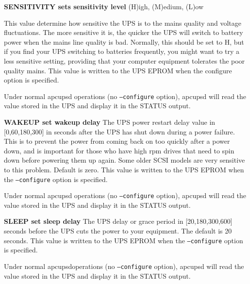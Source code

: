 \begin{description}

\item {\bf SENSITIVITY \lt{}sets sensitivity level\gt{}}
(H)igh, (M)edium, (L)ow  

This value determine how sensitive the UPS is to the mains quality and voltage
fluctuations. The more sensitive it is, the quicker the UPS will switch to
battery power when the mains line quality is bad. Normally, this should be set
to H, but if you find your UPS switching to batteries frequently, you might
want to try a less sensitive setting, providing that your computer equipment
tolerates the poor quality mains. This value is written to the UPS EPROM when
the configure option is specified.  

Under normal apcupsd operations (no {\tt --configure} option), apcupsd will
read the value stored in the UPS and display it in the STATUS output.  

\label{WAKEUP-_003cset-wakeup-delay_003e}

\item {\bf WAKEUP \lt{}set wakeup delay\gt{}}
The UPS power restart delay value in [0,60,180,300] in seconds after the UPS
has shut down during a power failure. This is to prevent the power from coming
back on too quickly after a power down, and is important for those who have
high rpm drives that need to spin down before powering them up again. Some
older SCSI models are very sensitive to this problem. Default is zero. This
value is written to the UPS EPROM when the {\tt --configure} option is
specified.  

Under normal apcupsd operations (no {\tt --configure} option), apcupsd will
read the value stored in the UPS and display it in the STATUS output.  

\label{SLEEP-_003cset-sleep-delay_003e}

\item {\bf SLEEP \lt{}set sleep delay\gt{}}
The UPS delay or grace period in [20,180,300,600] seconds before the UPS cuts
the power to your equipment. The default is 20 seconds. This value is written
to the UPS EPROM when the {\tt --configure} option is specified.  

Under normal apcupsdoperations (no {\tt --configure} option), apcupsd will
read the value stored in the UPS and display it in the STATUS output.  


\end{description}
